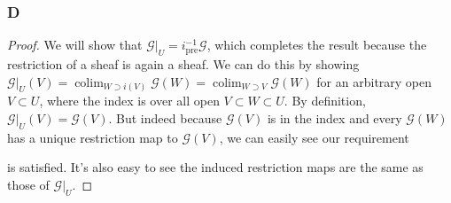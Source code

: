 \documentclass{article}
\newcommand{\id}{\mathrm{id}}
\newcommand{\fF}{\mathscr{F}}
\newcommand{\fG}{\mathscr{G}}
\DeclareMathOperator{\pre}{pre}
\DeclareMathOperator{\res}{res}
\DeclareMathOperator{\colim}{colim}
\DeclareMathOperator{\Mor}{Mor}
\begin{document}
\subsubsection{D}\label{2.7.D}
\begin{proof}
\iffalse
    Because the left-adjoint of $i_*$ is defined up to isomorphism, it suffices to show $(\vert_U, i_*)$ is an adjoint pair. Notice that for any open subset $V\subset Y$, $i^{-1}(V)=U\cap V$. On one hand, if we're given some $\phi \in \Mor(\fG\vert_U, \fF)$, we define $\tilde \phi:\fG \to i_* \fF$ be given by $\tilde \phi(V)=\phi(U\cap V)$ for any open $V\subset Y$. \fi
    We will show that $\fG\vert_U = i^{-1}_{\pre} \fG$, which completes the result because the restriction of a sheaf is again a sheaf. We can do this by showing $\fG\vert_U(V) = \colim_{W\supset i(V)} \fG(W) = \colim_{W\supset V} \fG(W)$ for an arbitrary open $V\subset U$, where the index is over all open $V\subset W\subset U$. By definition, $\fG\vert_U(V)=\fG(V)$. But indeed because $\fG(V)$ is in the index and every $\fG(W)$ has a unique restriction map to $\fG(V)$, we can easily see our requirement
    \begin{center}
    \end{center}
    is satisfied. It's also easy to see the induced restriction maps are the same as those of $\fG\vert_U$.
\end{proof}
\end{document}

